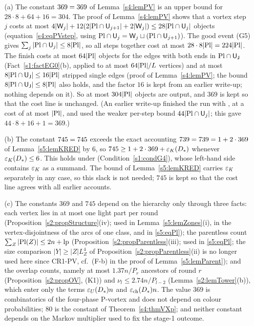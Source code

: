 \begin{remark}\label{s5:remConstants}
(a) The constant $369=369$ of Lemma~\ref{s4:lemPV} is an upper bound for $28\cdot8+64+16=304$. The proof of Lemma~\ref{s4:lemPV} shows that a vortex step $j$ costs at most $4|\mathsf{W}_j|+12(2|\mathrm{Pl}\cap\mathsf{U}_{j+1}|+2|\mathsf{W}_j|)\le28|\mathrm{Pl}\cap\mathsf{U}_j|$ objects (equation~\eqref{s4:eqPVstep}, using $\mathrm{Pl}\cap\mathsf{U}_j=\mathsf{W}_j\sqcup(\mathrm{Pl}\cap\mathsf{U}_{j+1})$). The good event (G5) gives $\sum_j|\mathrm{Pl}\cap\mathsf{U}_j|\le8|\mathrm{Pl}|$, so all steps together cost at most $28\cdot8|\mathrm{Pl}|=224|\mathrm{Pl}|$. The finish costs at most $64|\mathrm{Pl}|$ objects for the edges with both ends in $\mathrm{Pl}\cap\mathsf{U}_{\mathsf{J}}$ (Fact~\ref{s1:factEG0}(b), applied to at most $64|\mathrm{Pl}|/L$ vertices) and at most $8|\mathrm{Pl}\cap\mathsf{U}_{\mathsf{J}}|\le16|\mathrm{Pl}|$ stripped single edges (proof of Lemma~\ref{s4:lemPV}; the bound $8|\mathrm{Pl}\cap\mathsf{U}_{\mathsf{J}}|\le8|\mathrm{Pl}|$ also holds, and the factor $16$ is kept from an earlier write-up; nothing depends on it). So at most $304|\mathrm{Pl}|$ objects are output, and $369$ is kept so that the cost line is unchanged. (An earlier write-up finished the run with \cite[Theorem~2]{BM}, at a cost of at most $|\mathrm{Pl}|$, and used the weaker per-step bound $44|\mathrm{Pl}\cap\mathsf{U}_j|$; this gave $44\cdot8+16+1=369$.)

(b) The constant $745=745$ exceeds the exact accounting $739=739=1+2\cdot369$ of Lemma~\ref{s5:lemKRED} by $6$, so $745\ge1+2\cdot369+\varepsilon_{K}(D_{*})$ whenever $\varepsilon_{K}(D_{*})\le6$. This holds under  (Condition~\ref{s1:condG4}), whose left-hand side contains $\varepsilon_{K}$ as a summand. The bound of Lemma~\ref{s5:lemKRED} carries $\varepsilon_{K}$ separately in any case, so this slack is not needed; $745$ is kept so that the cost line agrees with all earlier accounts.

(c) The constants $369$ and $745$ depend on the hierarchy only through three facts: each vertex lies in at most one light part per round (Proposition~\ref{s2:propStructure}(iv); used in Lemma~\ref{s5:lemZones}(i), in the vertex-disjointness of the arcs of one class, and in \eqref{s5:eqPl}); the parentless count $\sum_Z|\mathrm{Pl}(Z)|\le2n+\mathrm{lp}$ (Proposition~\ref{s2:propParentless}(iii); used in \eqref{s5:eqPl}; the size comparison $|Y|\ge|Z|L_Z^4$ of Proposition~\ref{s2:propParentless}(ii) is no longer used here since \textsf{CR1-PV}, cf.\ (F-b) in the proof of Lemma~\ref{s5:lemParent}); and the overlap counts, namely at most $1.37n/P_r$ ancestors of round $r$ (Proposition~\ref{s2:propOV}, (K1)) and $\nu_l\le2.74n/P_{l-2}$ (Lemma~\ref{s2:lemTower}(b)), which enter only the terms $\varepsilon_{U}(D_{*})n$ and $\varepsilon_{\mathrm{ch}}(D_{*})n$. The value $369$ is combinatorics of the four-phase P-vortex and does not depend on colour probabilities; $80$ is the constant of Theorem~\ref{s4:thmVXp}; and neither constant depends on the Markov multiplier used to fix the stage-1 outcome.
\deps{\ref{s4:lemPV}, \ref{s5:lemKRED}, \ref{s2:propStructure}, \ref{s2:propParentless}, \ref{s2:propOV}, \ref{s2:lemTower}, \ref{s4:thmVXp}, \ref{s1:condG4}, \ref{s1:factEG0}}
\end{remark}
